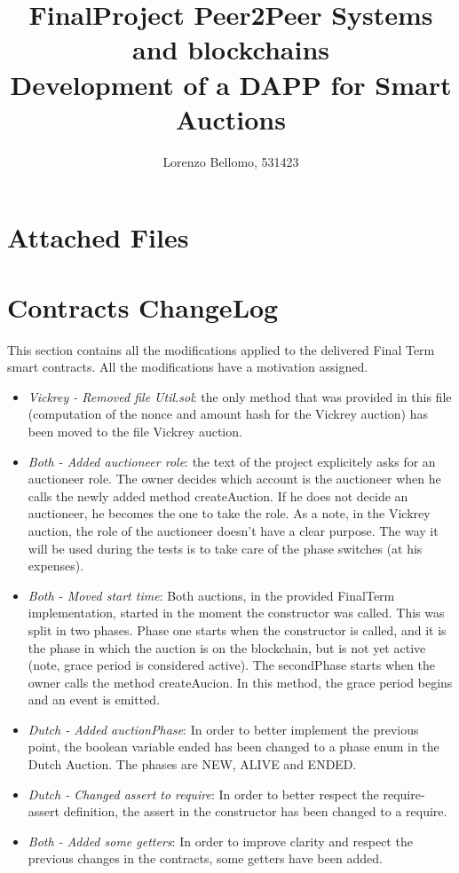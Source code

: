 \documentclass[11pt, a4paper]{report}
\title{
	FinalProject Peer2Peer Systems and blockchains \\
	\large Development of a DAPP for Smart Auctions}
\author{Lorenzo Bellomo, 531423}
\date{}
\begin{document}
	\maketitle
	
\section*{Attached Files}

\section*{Contracts ChangeLog}
This section contains all the modifications applied to the delivered Final Term smart contracts. All the modifications have a motivation assigned.
\begin{itemize}
	\item \emph{Vickrey - Removed file Util.sol}: the only method that was provided in this file (computation of the nonce and amount hash for the Vickrey auction) has been moved to the file Vickrey auction. 
	\item \emph{Both - Added auctioneer role}: the text of the project explicitely asks for an auctioneer role. The owner decides which account is the auctioneer when he calls the newly added method createAuction. If he does not decide an auctioneer, he becomes the one to take the role. As a note, in the Vickrey auction, the role of the auctioneer doesn't have a clear purpose. The way it will be used during the tests is to take care of the phase switches (at his expenses).
	\item \emph{Both - Moved start time}: Both auctions, in the provided FinalTerm implementation, started in the moment the constructor was called. This was split in two phases. Phase one starts when the constructor is called, and it is the phase in which the auction is on the blockchain, but is not yet active (note, grace period is considered active). The secondPhase starts when the owner calls the method createAucion. In this method, the grace period begins and an event is emitted.
	\item \emph{Dutch - Added auctionPhase}: In order to better implement the previous point, the boolean variable ended has been changed to a phase enum in the Dutch Auction. The phases are NEW, ALIVE and ENDED.
	\item \emph{Dutch - Changed assert to require}: In order to better respect the require-assert definition, the assert in the constructor has been changed to a require.
	\item \emph{Both - Added some getters}: In order to improve clarity and respect the previous changes in the contracts, some getters have been added.
\end{itemize}
	
	
\end{document}
